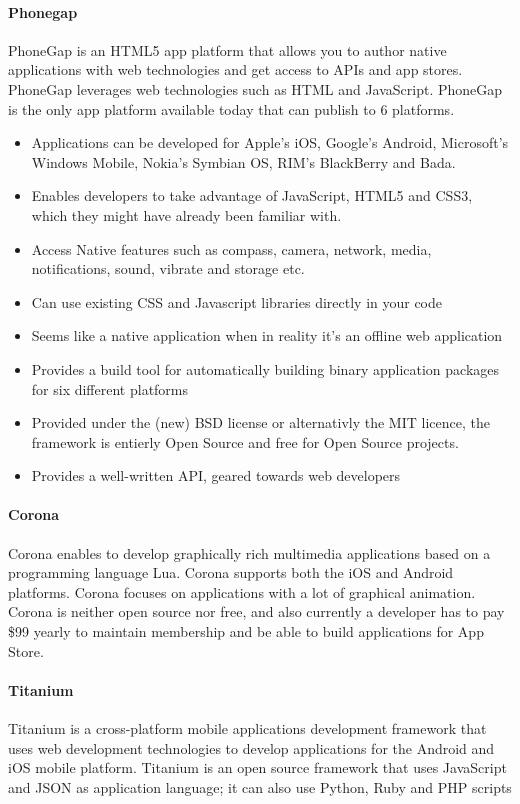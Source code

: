 \paragraph{\bf{Phonegap}}
PhoneGap is an HTML5 app platform that allows you to author native applications with web technologies and get access to APIs and app stores. PhoneGap leverages web technologies such as HTML and JavaScript. PhoneGap is the only app platform available today that can publish to 6 platforms.
\cite{phonegap:about}
	\begin{itemize}
		\item Applications can be developed for Apple’s iOS, Google’s Android,
		Microsoft’s Windows Mobile, Nokia’s Symbian OS, RIM’s BlackBerry and Bada.
		\item Enables developers to take advantage of JavaScript, HTML5 and CSS3,
		which they might have already been familiar with.
		\item Access Native features such as compass, camera, network, media,
		notifications, sound, vibrate and storage etc.
    \item Can use existing CSS and Javascript libraries directly in your code
    \item Seems like a native application when in reality it's an offline web application
    \item Provides a build tool for automatically building binary application packages for six different platforms
    \item Provided under the (new) BSD license or alternativly the MIT licence, the framework is entierly Open Source and free for Open Source projects.
    \item Provides a well-written API, geared towards web developers
	\end{itemize}

\paragraph{Corona}
Corona enables to develop graphically rich multimedia applications based on a programming
language Lua\cite{corona:about}. Corona supports both the iOS and Android platforms. Corona focuses on
applications with a lot of graphical animation. Corona is neither open source nor free, and also currently a developer
has to pay \$99 yearly to maintain membership and be able to build applications for App Store.

\paragraph{Titanium}
Titanium is a cross-platform mobile applications development framework that uses web
development technologies to develop applications for the Android and iOS mobile platform.
Titanium is an open source framework that uses JavaScript and JSON as application language;
it can also use Python, Ruby and PHP scripts\cite{titanium:about}
